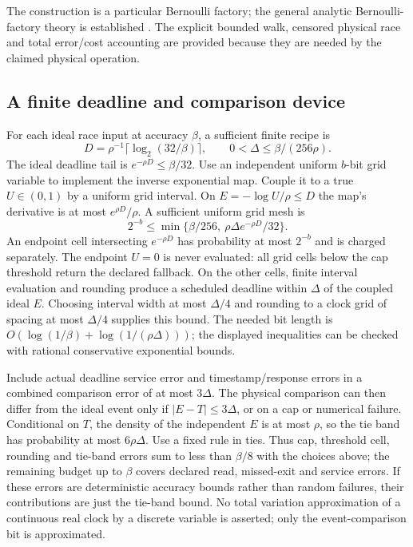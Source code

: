 The construction is a particular Bernoulli factory; the general analytic
Bernoulli-factory theory is established \cite{nacuperes}. The explicit
bounded walk, censored physical race and total error/cost accounting are
provided because they are needed by the claimed physical operation.

\subsection{A finite deadline and comparison device}

For each ideal race input at accuracy $\beta$, a sufficient finite recipe is
\begin{equation}\label{eq:timing}
 D=\rho^{-1}\lceil\log_2(32/\beta)\rceil,\qquad
 0<\Delta\le\beta/(256\rho).
\end{equation}
The ideal deadline tail is $e^{-\rho D}\le\beta/32$.
Use an independent uniform $b$-bit grid variable to implement the inverse
exponential map. Couple it to a true $U\in(0,1)$ by a uniform grid interval.
On $E=-\log U/\rho\le D$ the map's derivative is at most
$e^{\rho D}/\rho$. A sufficient uniform grid mesh is
\[
 2^{-b}\le\min\{\beta/256,\ \rho\Delta e^{-\rho D}/32\}.
\]
An endpoint cell intersecting $e^{-\rho D}$ has probability at most
$2^{-b}$ and is charged separately. The endpoint $U=0$ is never evaluated:
all grid cells below the cap threshold return the declared fallback.
On the other cells, finite interval evaluation and rounding produce a
scheduled deadline within $\Delta$ of the coupled ideal $E$. Choosing
interval width at most $\Delta/4$ and rounding to a clock grid of spacing
at most $\Delta/4$ supplies this bound. The needed bit length is
$O(\log(1/\beta)+\log(1/(\rho\Delta)))$; the displayed inequalities can be
checked with rational conservative exponential bounds.

Include actual deadline service error and timestamp/response errors in a
combined comparison error of at most $3\Delta$. The physical comparison can
then differ from the ideal event only if $|E-T|\le3\Delta$, or on a cap or
numerical failure. Conditional on $T$, the density of the independent $E$
is at most $\rho$, so the tie band has probability at most $6\rho\Delta$.
Use a fixed rule in ties. Thus cap, threshold cell, rounding and tie-band
errors sum to less than $\beta/8$ with the choices above; the remaining
budget up to $\beta$ covers declared read, missed-exit and service errors.
If these errors are deterministic accuracy bounds rather than random
failures, their contributions are just the tie-band bound. No total
variation approximation of a continuous real clock by a discrete variable
is asserted; only the event-comparison bit is approximated.

